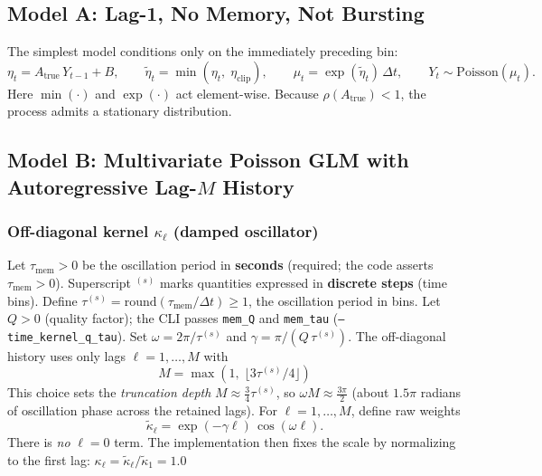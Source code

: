 \documentclass[11pt]{article}
\begin{document}
\subsection{Model A: Lag-1, No Memory, Not Bursting}
\label{sec:lag1}

The simplest model conditions only on the immediately preceding bin:
\begin{equation}
  \eta_t = A_{\text{true}}\,Y_{t-1}+B,
  \qquad
  \tilde{\eta}_t = \min(\eta_t,\;\eta_{\mathrm{clip}}),
  \qquad
  \mu_t = \exp(\tilde{\eta}_t)\,\Delta t,
  \qquad
  Y_t \sim \mathrm{Poisson}(\mu_t).
  \label{eq:lag1}
\end{equation}
Here $\min(\cdot)$ and $\exp(\cdot)$ act element-wise. 
Because $\rho(A_{\text{true}})<1$, the process admits a stationary
distribution.

\subsection{Model B: Multivariate Poisson GLM with Autoregressive Lag-$M$ History}
\label{sec:lagM_single}

\subsubsection{Off-diagonal kernel $\kappa_\ell$ (damped oscillator)}


Let $\tau_{\mathrm{mem}}>0$ be the oscillation period in \textbf{seconds}
(required; the code asserts $\tau_{\mathrm{mem}}>0$).
Superscript ${}^{(s)}$ marks quantities expressed in \textbf{discrete steps}
(time bins).
Define $\tau^{(s)}=\mathrm{round}(\tau_{\mathrm{mem}}/\Delta t)\ge 1$, the oscillation period in bins.
Let $Q>0$ (quality factor); the CLI passes \texttt{mem\_Q} and \texttt{mem\_tau}
(\texttt{--time\_kernel\_q\_tau}).
Set $\omega=2\pi/\tau^{(s)}$ and $\gamma=\pi/(Q\,\tau^{(s)})$.
The off-diagonal history uses only lags $\ell=1,\dots,M$ with
\begin{equation}
  M = \max\!\left(1,\;\bigl\lfloor 3\tau^{(s)}/4\bigr\rfloor\right)
\end{equation}
This choice sets the \emph{truncation depth} $M\approx \tfrac{3}{4}\tau^{(s)}$,
so $\omega M\approx \tfrac{3\pi}{2}$ (about $1.5\pi$ radians of oscillation phase
across the retained lags). 
For $\ell=1,\dots,M$, define raw weights
\begin{equation}
  \tilde{\kappa}_\ell = \exp(-\gamma \ell)\,\cos(\omega \ell).
  \label{eq:kappa_offdiag_gen4}
\end{equation}
There is \emph{no} $\ell=0$ term.
The implementation then fixes the scale by normalizing to the first lag:
$\kappa_\ell = \tilde{\kappa}_\ell / \tilde{\kappa}_1=1.0$
\end{document}
